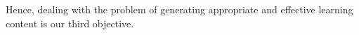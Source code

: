 \documentclass[letterpaper%
, twoside%
, 12pt%
,these%
, english%
,creativecommons,hyperref, withAlgo2e %
]{thETS}
\begin{document}
Hence, dealing with the problem of generating appropriate and effective learning content is our third objective.

\end{document}

